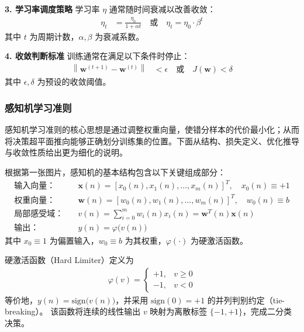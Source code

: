 \begin{example}[梯度下降算法中的批次与周期概念]
\textbf{3. 学习率调度策略}
学习率 $\eta$ 通常随时间衰减以改善收敛：
\begin{align}
\eta_t &= \frac{\eta_0}{1 + \alpha t} \quad \text{或} \quad \eta_t = \eta_0 \cdot \beta^t
\end{align}
其中 $t$ 为周期计数，$\alpha, \beta$ 为衰减系数。

\textbf{4. 收敛判断标准}
训练通常在满足以下条件时停止：
\begin{align}
\left\| \boldsymbol{w}^{(t+1)} - \boldsymbol{w}^{(t)} \right\| &< \epsilon \quad \text{或} \quad J(\boldsymbol{w}) < \delta
\end{align}
其中 $\epsilon, \delta$ 为预设的收敛阈值。
\end{example}

\subsubsection{感知机学习准则}

感知机学习准则的核心思想是通过调整权重向量，使错分样本的代价最小化；从而将决策超平面推向能够正确划分训练集的位置。下面从结构、损失定义、优化推导与收敛性质给出更为细化的说明。

\begin{definition}[感知机基本结构]
根据第一张图片，感知机的基本结构包含以下关键组成部分：
\begin{align}
\text{输入向量：} & \quad \boldsymbol{x}(n) = [x_0(n), x_1(n), \ldots, x_m(n)]^T,\quad x_0(n)\equiv +1 \\[2pt]
\text{权重向量：} & \quad \boldsymbol{w}(n) = [w_0(n), w_1(n), \ldots, w_m(n)]^T,\quad w_0(n)\equiv b \\[2pt]
\text{局部感受域：} & \quad v(n) = \sum_{i=0}^{m} w_i(n)x_i(n) = \boldsymbol{w}^T(n)\boldsymbol{x}(n) \\[2pt]
\text{输出：} & \quad y(n) = \varphi\!\big(v(n)\big)
\end{align}
其中 $x_0\equiv 1$ 为偏置输入，$w_0\equiv b$ 为其权重，$\varphi(\cdot)$ 为硬激活函数。
\end{definition}

\begin{definition}[硬激活函数与符号约定]
硬激活函数（Hard Limiter）定义为
\begin{align}
\varphi(v) =
\begin{cases}
+1, & v \ge 0 \\
-1, & v < 0
\end{cases}
\end{align}
等价地，$y(n)=\mathrm{sign}\!\big(v(n)\big)$，并采用 $\mathrm{sign}(0)=+1$ 的并列判别约定（tie-breaking）。
该函数将连续的线性输出 $v$ 映射为离散标签 $\{-1,+1\}$，完成二分类决策。
\end{definition}

